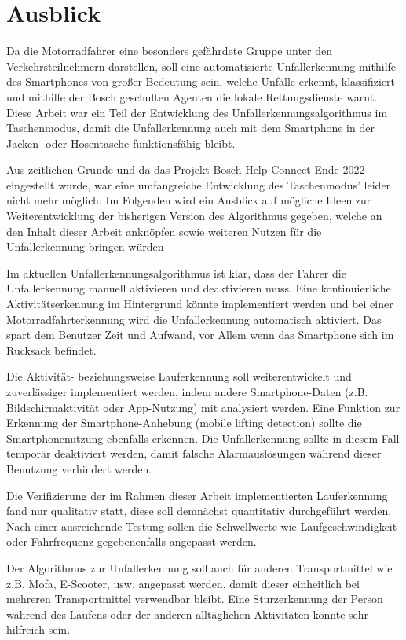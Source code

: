 \chapter{Ausblick}

Da die Motorradfahrer eine besonders gefährdete Gruppe unter den Verkehrsteilnehmern darstellen, soll eine automatisierte Unfallerkennung mithilfe des Smartphones von großer Bedeutung sein, welche Unfälle erkennt, klassifiziert und mithilfe der Bosch geschulten Agenten die lokale Rettungsdienste warnt. Diese Arbeit war ein Teil der Entwicklung des Unfallerkennungsalgorithmus im Taschenmodus, damit die Unfallerkennung auch mit dem Smartphone in der Jacken- oder Hosentasche funktionsfähig bleibt.

Aus zeitlichen Grunde und da das Projekt \glqq Bosch Help Connect\grqq{} Ende 2022 eingestellt wurde, war eine umfangreiche Entwicklung des Taschenmodus' leider nicht mehr möglich.
Im Folgenden wird ein Ausblick auf mögliche Ideen zur Weiterentwicklung der bisherigen Version des Algorithmus gegeben, welche an den Inhalt dieser Arbeit anknöpfen sowie weiteren Nutzen für die Unfallerkennung bringen würden

Im aktuellen Unfallerkennungsalgorithmus ist klar, dass der Fahrer die Unfallerkennung manuell aktivieren und deaktivieren muss. Eine kontinuierliche Aktivitätserkennung im Hintergrund könnte implementiert werden und bei einer Motorradfahrterkennung wird die Unfallerkennung automatisch aktiviert. Das spart dem Benutzer Zeit und Aufwand, vor Allem wenn das Smartphone sich im Rucksack befindet. %

Die Aktivität- beziehungsweise Lauferkennung soll weiterentwickelt und zuverlässiger implementiert werden, indem andere Smartphone-Daten (z.B. Bildschirmaktivität oder App-Nutzung) mit analysiert werden.
Eine Funktion zur Erkennung der Smart\-phone-Anhebung (mobile lifting detection) sollte die Smartphonenutzung ebenfalls erkennen. Die Unfallerkennung sollte in diesem Fall temporär deaktiviert werden, damit falsche Alarmauslösungen während dieser Benutzung verhindert werden.

Die Verifizierung der im Rahmen dieser Arbeit implementierten Lauferkennung fand nur qualitativ statt, diese soll demnächst quantitativ durchgeführt werden. Nach einer ausreichende Testung sollen die Schwellwerte wie Laufgeschwindigkeit oder Fahrfrequenz gegebenenfalls angepasst werden.

Der Algorithmus zur Unfallerkennung soll auch für anderen Transportmittel wie z.B. Mofa, E-Scooter, usw. angepasst werden, damit dieser einheitlich bei mehreren Transportmittel verwendbar bleibt. Eine Sturzerkennung der Person während des Laufens oder der anderen alltäglichen Aktivitäten könnte sehr hilfreich sein.


